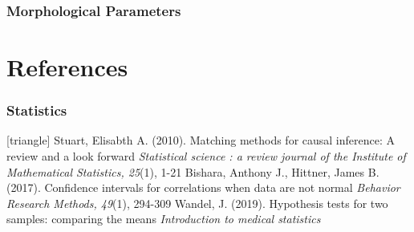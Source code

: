 \documentclass[xcolor=table]{beamer}
\begin{document}
\begin{frame}
	\frametitle{Morphological Parameters}
	\begin{table}[h!]
		\centering
		\caption{Summary of the morphological parameters}\label{}
	\end{table}
\end{frame}


\appendix

\section{References}
\begin{frame}
	\frametitle{Statistics}
	\footnotesize{
		\begin{thebibliography}{99}
			[triangle]
			 Stuart, Elisabth A. (2010).
			\newblock Matching methods for causal inference: A review and a look forward
			\newblock \textit{Statistical science : a review journal of the Institute of Mathematical Statistics, 25}(1), 1-21
			\vspace{1mm}
			 Bishara, Anthony J., Hittner, James B. (2017).
			\newblock Confidence intervals for correlations when data are not normal
			\newblock \textit{Behavior Research Methods, 49}(1), 294-309
			\vspace{1mm}
			 Wandel, J. (2019).
			\newblock Hypothesis tests for two samples: comparing the means
			\newblock \textit{Introduction to medical statistics}
		\end{thebibliography}
	}
\end{frame}

\end{document}
